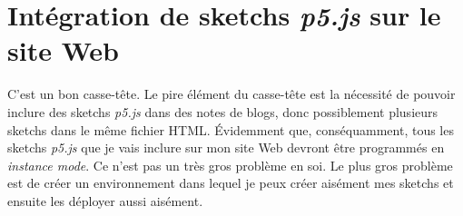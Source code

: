 \section{Intégration de sketchs \textit{p5.js} sur le site Web}

C'est un bon casse-tête. Le pire élément du casse-tête est la nécessité de pouvoir inclure des sketchs \textit{p5.js} dans des notes de blogs, donc possiblement plusieurs sketchs dans le même fichier HTML. Évidemment que, conséquamment, tous les sketchs \textit{p5.js} que je vais inclure sur mon site Web devront être programmés en \textit{instance mode}. Ce n'est pas un très gros problème en soi. Le plus gros problème est de créer un environnement dans lequel je peux créer aisément mes sketchs et ensuite les déployer aussi aisément.